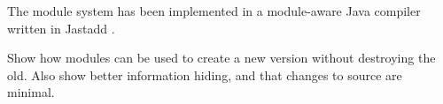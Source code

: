 The module system has been implemented in a module-aware Java
compiler written in Jastadd \cite{jastadd}.

Show how modules can be used to create a new version without
destroying the old. Also show better information hiding, and
that changes to source are minimal.